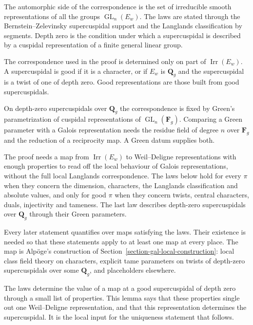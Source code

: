 The automorphic side of the correspondence is the set of irreducible smooth representations of all
the groups $\operatorname{GL}_n(E_w)$. The laws are stated through the Bernstein--Zelevinsky
supercuspidal support and the Langlands classification by segments. Depth zero is the condition
under which a supercuspidal is described by a cuspidal representation of a finite general linear
group.

The correspondence used in the proof is determined only on part of
$\operatorname{Irr}(E_w)$. A supercuspidal is good if it is a character, or if $E_w$ is
$\mathbf Q_g$ and the supercuspidal is a twist of one of depth zero. Good representations are those
built from good supercuspidals.

On depth-zero supercuspidals over $\mathbf Q_g$ the correspondence is fixed by Green's
parametrization of cuspidal representations of $\operatorname{GL}_n(\mathbf F_g)$. Comparing a Green
parameter with a Galois representation needs the residue field of degree $n$ over $\mathbf F_g$ and
the reduction of a reciprocity map. A Green datum supplies both.

The proof needs a map from $\operatorname{Irr}(E_w)$ to Weil--Deligne representations with
enough properties to read off the local behaviour of Galois representations, without the full local
Langlands correspondence.
The laws below hold for every $\pi$ when they concern the dimension, characters, the Langlands
classification and absolute values, and only for good $\pi$ when they concern twists, central
characters, duals, injectivity and tameness. The last law describes depth-zero supercuspidals over
$\mathbf Q_g$ through their Green parameters.

Every later statement quantifies over maps satisfying the laws. Their existence is needed so that
these statements apply to at least one map at every place. The map is Alp\"oge's construction of
Section~\ref{section-gal-local-construction}: local class field theory on characters, explicit tame
parameters on twists of depth-zero supercuspidals over some $\mathbf Q_g$, and placeholders elsewhere.

The laws determine the value of a map at a good supercuspidal of depth zero through a small list of
properties. This lemma says that these properties single out one Weil--Deligne representation, and
that this representation determines the supercuspidal. It is the local input for the uniqueness
statement that follows.


